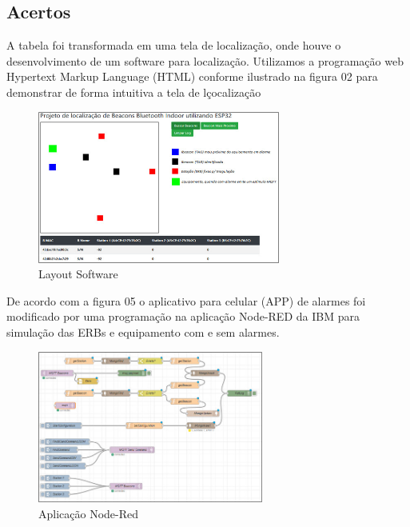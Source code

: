 \documentclass[
	article,			%
	12pt,				%
	oneside,			%
	a4paper,			%
	english,			%
	brazil,				%
	sumario=tradicional
	]{abntex2}
\begin{document}
\subsection{Acertos}
A tabela foi transformada em uma tela de localização, onde houve o desenvolvimento de um software para localização. Utilizamos a programação web Hypertext Markup Language (HTML) conforme ilustrado na figura 02 para demonstrar de forma intuitiva a tela de lçocalização
\begin{figure}[H]
	\begin{center}
		\caption{Layout Software}
		\includegraphics[height=5cm]{image4}
	\end{center}
\end{figure}	
De acordo com a figura 05 o aplicativo para celular (APP) de alarmes foi modificado por uma programação na aplicação Node-RED da IBM para simulação das ERBs e equipamento com e sem alarmes.
\begin{figure}[H]
	\begin{center}
		\caption{Aplicação Node-Red}
		\includegraphics[height=5cm]{image5}
	\end{center}
\end{figure}	
\end{document}
